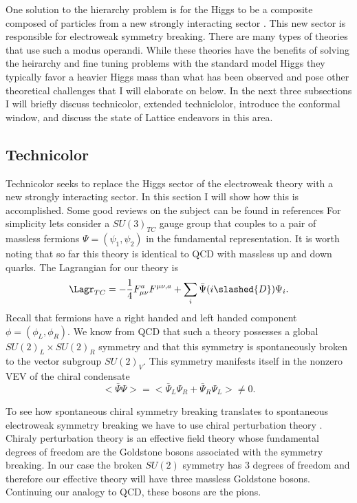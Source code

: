 
One solution to the hierarchy problem is for the Higgs to be a composite composed of particles from a new strongly interacting sector \cite{Kaplan:1983sm,Georgi:1984af,Weinberg:1975gm,Susskind:1978ms, Weinberg:1979bn, Eichten:1979ah, Dimopoulos:1979es}.
This new sector is responsible for electroweak symmetry breaking.
There are many types of theories that use such a modus operandi.
While these theories have the benefits of solving the heirarchy and fine tuning problems with the standard model Higgs they typically favor a heavier Higgs mass than what has been observed and pose other theoretical challenges that I will elaborate on below.
In the next three subsections I will briefly discuss technicolor, extended techniclolor, introduce the conformal window, and discuss the state of Lattice endeavors in this area.

\subsection{Technicolor}

Technicolor seeks to replace the Higgs sector of the electroweak theory with a new strongly interacting sector.
In this section I will show how this is accomplished.
Some good reviews on the subject can be found in references \cite{Hill2003235,lane,Shrock:2007km,martin,Sannino:2009za}
For simplicity lets consider a $SU(3)_{TC}$ gauge group that couples to a pair of massless fermions $\Psi=(\psi_1,\psi_2)$ in the fundamental representation.
It is worth noting that so far this theory is identical to QCD with massless up and down quarks.
The Lagrangian for our theory is
\begin{equation}
  \begin{aligned}
    \Lagr_{TC}=-\frac{1}{4}F^a_{\mu\nu}F^{\mu\nu,a}+\sum_i \bar{\Psi}(i\slashed{D})\Psi_i.
  \end{aligned}
\end{equation}
Recall that fermions have a right handed and left handed component $\phi=(\phi_L,\phi_R)$.
We know from QCD that such a theory possesses a global $SU(2)_L\times SU(2)_R$ symmetry and that this symmetry is spontaneously broken to the vector subgroup $SU(2)_V$.
This symmetry manifests itself in the nonzero VEV of the chiral condensate
\begin{equation}
  <\bar{\Psi}\Psi>=<\bar{\Psi}_L\Psi_R+\bar{\Psi}_R\Psi_L>\neq 0.
\end{equation}

To see how spontaneous chiral symmetry breaking translates to spontaneous electroweak symmetry breaking we have to use chiral perturbation theory \cite{Gasser:1983yg,Golterman:2009kw}.
Chiraly perturbation theory is an effective field theory whose fundamental degrees of freedom are the Goldstone bosons associated with the symmetry breaking.
In our case the broken $SU(2)$ symmetry has 3 degrees of freedom and therefore our effective theory will have three massless Goldstone bosons.
Continuing our analogy to QCD, these bosons are the pions.

